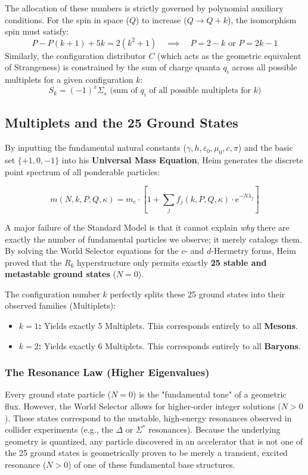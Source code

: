 \documentclass[11pt,a4paper,oneside]{article}
\newcommand{\eu}{\mathrm{e}}              %
\begin{document}
The allocation of these numbers is strictly governed by polynomial auxiliary conditions. For the spin in space ($Q$) to increase ($Q \to Q+k$), the isomorphism spin must satisfy:
\begin{equation}
    P - P(k+1) + 5k = 2(k^2+1) \quad \implies \quad P = 2-k \text{ or } P = 2k-1
\end{equation}
Similarly, the configuration distributor $C$ (which acts as the geometric equivalent of Strangeness) is constrained by the sum of charge quanta $q_i$ across all possible multiplets for a given configuration $k$:
\begin{equation}
    S_k = (-1)^x \Sigma_s \text{ (sum of } q_i \text{ of all possible multiplets for } k)
\end{equation}

\subsection{Multiplets and the 25 Ground States}

By inputting the fundamental natural constants ($\gamma, h, \varepsilon_0, \mu_0, c, \pi$) and the basic set $\{+1, 0, -1\}$ into his \textbf{Universal Mass Equation}, Heim generates the discrete point spectrum of all ponderable particles:

\begin{equation}
    m(N, k, P, Q, \kappa) = m_e \cdot \left[ 1 + \sum_{j} f_j(k, P, Q, \kappa) \cdot \eu^{-N \lambda_j} \right]
\end{equation}

A major failure of the Standard Model is that it cannot explain \textit{why} there are exactly the number of fundamental particles we observe; it merely catalogs them. By solving the World Selector equations for the $c$- and $d$-Hermetry forms, Heim proved that the $R_6$ hyperstructure only permits exactly \textbf{25 stable and metastable ground states} ($N=0$). 

The configuration number $k$ perfectly splits these 25 ground states into their observed families (Multiplets):
\begin{itemize}
    \item \textbf{$k=1$:} Yields exactly 5 Multiplets. This corresponds entirely to all \textbf{Mesons}.
    \item \textbf{$k=2$:} Yields exactly 6 Multiplets. This corresponds entirely to all \textbf{Baryons}.
\end{itemize}

\subsubsection{The Resonance Law (Higher Eigenvalues)}
Every ground state particle ($N=0$) is the "fundamental tone" of a geometric flux. However, the World Selector allows for higher-order integer solutions ($N>0$). These states correspond to the unstable, high-energy resonances observed in collider experiments (e.g., the $\Delta$ or $\Sigma^*$ resonances). Because the underlying geometry is quantized, any particle discovered in an accelerator that is not one of the 25 ground states is geometrically proven to be merely a transient, excited resonance ($N > 0$) of one of these fundamental base structures.
\end{document}
